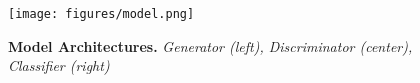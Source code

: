 \begin{figure}[ht!]
    \centering
    \texttt{[image: figures/model.png]}
    \caption{\textbf{Model Architectures.} \textit{Generator (left), Discriminator (center), Classifier (right)}}
    \label{fig:model}
\end{figure}
